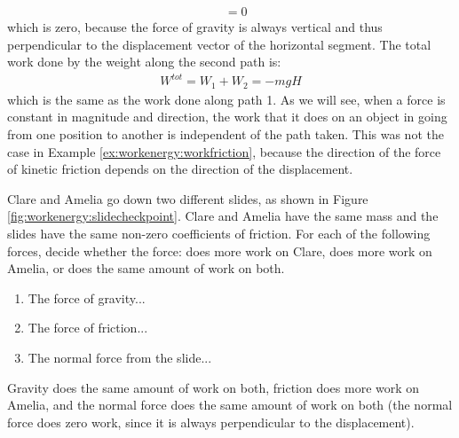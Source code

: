 \begin{example}
\begin{align*}
&=0
\end{align*}
which is zero, because the force of gravity is always vertical and thus perpendicular to the displacement vector of the horizontal segment. The total work done by the weight along the second path is:
\begin{align*}
W^{tot} = W_1 + W_2 = -mgH
\end{align*}
which is the same as the work done along path 1. As we will see, when a force is constant in magnitude and direction, the work that it does on an object in going from one position to another is independent of the path taken. This was not the case in Example \ref{ex:workenergy:workfriction}, because the direction of the force of kinetic friction depends on the direction of the displacement. 
\end{example} 

\begin{checkpoint}
Clare and Amelia go down two different slides, as shown in Figure \ref{fig:workenergy:slidecheckpoint}. Clare and Amelia have the same mass and the slides have the same non-zero coefficients of friction. 
For each of the following forces, decide whether the force: does more work on Clare, does more work on Amelia, or does the same amount of work on both.
\begin{enumerate}
\item The force of gravity... 
\item The force of friction... 
\item The normal force from the slide... 
\end{enumerate}
\begin{answer}
Gravity does the same amount of work on both, friction does more work on Amelia, and the normal force does the same amount of work on both (the normal force does zero work, since it is always perpendicular to the displacement). 
\end{answer}
\end{checkpoint}

